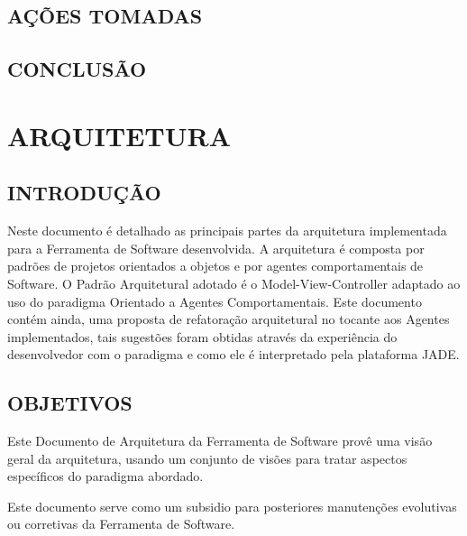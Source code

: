 \begin{apendicesenv}
\begin{center}
\begin{longtable}{| p{4cm} | p{4cm} |p{4cm} |p{2cm} |}
\label{t1}
\end{longtable}
\end{center}


\section{AÇÕES TOMADAS} 

\section{CONCLUSÃO} 

\chapter{ARQUITETURA}
\section{INTRODUÇÃO}

Neste documento é detalhado as principais partes da arquitetura implementada para a Ferramenta de Software desenvolvida.  A arquitetura é composta por padrões de projetos orientados a objetos e por agentes comportamentais de Software. O Padrão Arquitetural adotado é o Model-View-Controller adaptado ao uso do paradigma Orientado a Agentes Comportamentais. Este documento contém ainda, uma proposta de refatoração arquitetural no tocante aos Agentes implementados, tais sugestões foram obtidas através da experiência do desenvolvedor com o paradigma e como ele é interpretado pela plataforma JADE.

\section{OBJETIVOS}

Este Documento de Arquitetura da Ferramenta de Software provê uma visão geral da arquitetura, usando um conjunto de visões para tratar aspectos específicos do paradigma abordado. 

Este documento serve como um subsidio para posteriores manutenções evolutivas ou corretivas da Ferramenta de Software.




\end{apendicesenv}

